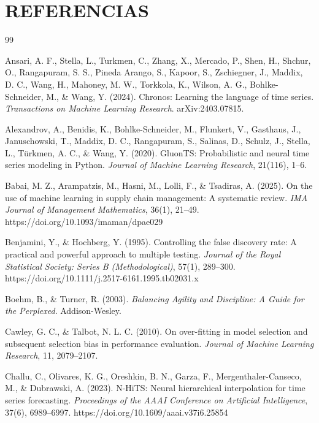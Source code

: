 \section{REFERENCIAS}
\begin{thebibliography}{99}

 Ansari, A. F., Stella, L., Turkmen, C., Zhang, X., Mercado, P., Shen, H., Shchur, O., Rangapuram, S. S., Pineda Arango, S., Kapoor, S., Zschiegner, J., Maddix, D. C., Wang, H., Mahoney, M. W., Torkkola, K., Wilson, A. G., Bohlke-Schneider, M., \& Wang, Y. (2024). Chronos: Learning the language of time series. \textit{Transactions on Machine Learning Research}. arXiv:2403.07815.

 Alexandrov, A., Benidis, K., Bohlke-Schneider, M., Flunkert, V., Gasthaus, J., Januschowski, T., Maddix, D. C., Rangapuram, S., Salinas, D., Schulz, J., Stella, L., Türkmen, A. C., \& Wang, Y. (2020). GluonTS: Probabilistic and neural time series modeling in Python. \textit{Journal of Machine Learning Research}, 21(116), 1--6.

 Babai, M. Z., Arampatzis, M., Hasni, M., Lolli, F., \& Tsadiras, A. (2025). On the use of machine learning in supply chain management: A systematic review. \textit{IMA Journal of Management Mathematics}, 36(1), 21--49. https://doi.org/10.1093/imaman/dpae029

 Benjamini, Y., \& Hochberg, Y. (1995). Controlling the false discovery rate: A practical and powerful approach to multiple testing. \textit{Journal of the Royal Statistical Society: Series B (Methodological)}, 57(1), 289--300. https://doi.org/10.1111/j.2517-6161.1995.tb02031.x

 Boehm, B., \& Turner, R. (2003). \textit{Balancing Agility and Discipline: A Guide for the Perplexed}. Addison-Wesley.

 Cawley, G. C., \& Talbot, N. L. C. (2010). On over-fitting in model selection and subsequent selection bias in performance evaluation. \textit{Journal of Machine Learning Research}, 11, 2079--2107.

 Challu, C., Olivares, K. G., Oreshkin, B. N., Garza, F., Mergenthaler-Canseco, M., \& Dubrawski, A. (2023). N-HiTS: Neural hierarchical interpolation for time series forecasting. \textit{Proceedings of the AAAI Conference on Artificial Intelligence}, 37(6), 6989--6997. https://doi.org/10.1609/aaai.v37i6.25854


\end{thebibliography}
